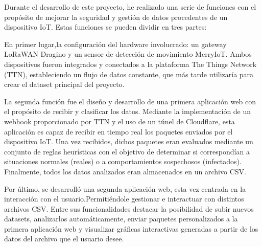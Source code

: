 
Durante el desarrollo de este proyecto, he realizado una serie de funciones con el propósito de mejorar la seguridad y gestión de datos procedentes de un dispositivo IoT. Estas funciones se pueden dividir en tres partes:

En primer lugar,la configuración del hardware involucrado: un gateway LoRaWAN Dragino y un sensor de detección de movimiento MerryIoT. Ambos dispositivos fueron integrados y conectados a la plataforma The Things Network (TTN), estableciendo un flujo de datos constante, que más tarde utilizaría para crear el dataset principal del proyecto.

La segunda función fue el diseño y desarrollo de una primera aplicación web con el propósito de recibir y clasificar los datos. Mediante la implementación de un webhook proporcionado por TTN y el uso de un túnel de Cloudflare, esta aplicación es capaz de recibir en tiempo real los paquetes enviados por el dispositivo IoT. Una vez recibidos, dichos paquetes eran evaluados mediante un conjunto de reglas heurísticas con el objetivo de determinar si correspondían a situaciones normales (reales) o a comportamientos sospechosos (infectados). Finalmente, todos los datos analizados eran almacenados en un archivo CSV.

Por último, se desarrolló una segunda aplicación web, esta vez centrada en la interacción con el usuario.Permitiéndole gestionar e interactuar con distintos archivos CSV. Entre sus funcionalidades destacar la posibilidad de subir nuevos datasets, analizarlos automáticamente, enviar paquetes personalizados a la primera aplicación web y visualizar gráficas interactivas generadas a partir de los datos del archivo que el usuario desee.


